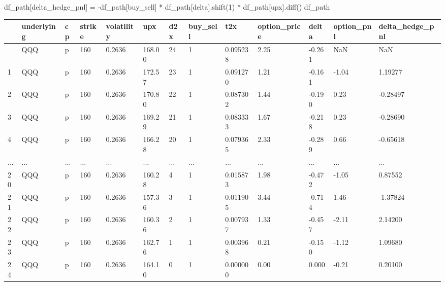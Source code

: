 \documentclass[
  letterpaper,
  DIV=11,
  numbers=noendperiod]{scrreprt}
\newenvironment{Shaded}{\begin{snugshade}}{\end{snugshade}}
\newcommand{\DecValTok}[1]{\textcolor[rgb]{0.68,0.00,0.00}{#1}}
\newcommand{\NormalTok}[1]{\textcolor[rgb]{0.00,0.23,0.31}{#1}}
\newcommand{\OperatorTok}[1]{\textcolor[rgb]{0.37,0.37,0.37}{#1}}
\newcommand{\StringTok}[1]{\textcolor[rgb]{0.13,0.47,0.30}{#1}}
\begin{document}
\begin{Shaded}
\begin{Highlighting}[]
\NormalTok{df\_path[}\StringTok{\textquotesingle{}delta\_hedge\_pnl\textquotesingle{}}\NormalTok{] }\OperatorTok{=} \OperatorTok{{-}}\NormalTok{df\_path[}\StringTok{\textquotesingle{}buy\_sell\textquotesingle{}}\NormalTok{] }\OperatorTok{*}\NormalTok{ df\_path[}\StringTok{\textquotesingle{}delta\textquotesingle{}}\NormalTok{].shift(}\DecValTok{1}\NormalTok{) }\OperatorTok{*}\NormalTok{ df\_path[}\StringTok{\textquotesingle{}upx\textquotesingle{}}\NormalTok{].diff() }
\NormalTok{df\_path}
\end{Highlighting}
\end{Shaded}

\begin{longtable}[]{@{}lllllllllllll@{}}
\toprule\noalign{}
& underlying & cp & strike & volatility & upx & d2x & buy\_sell & t2x &
option\_price & delta & option\_pnl & delta\_hedge\_pnl \\
\midrule\noalign{}
\endhead
\bottomrule\noalign{}
\endlastfoot
0 & QQQ & p & 160 & 0.2636 & 168.00 & 24 & 1 & 0.095238 & 2.25 & -0.261
& NaN & NaN \\
1 & QQQ & p & 160 & 0.2636 & 172.57 & 23 & 1 & 0.091270 & 1.21 & -0.161
& -1.04 & 1.19277 \\
2 & QQQ & p & 160 & 0.2636 & 170.80 & 22 & 1 & 0.087302 & 1.44 & -0.190
& 0.23 & -0.28497 \\
3 & QQQ & p & 160 & 0.2636 & 169.29 & 21 & 1 & 0.083333 & 1.67 & -0.218
& 0.23 & -0.28690 \\
4 & QQQ & p & 160 & 0.2636 & 166.28 & 20 & 1 & 0.079365 & 2.33 & -0.289
& 0.66 & -0.65618 \\
... & ... & ... & ... & ... & ... & ... & ... & ... & ... & ... & ... &
... \\
20 & QQQ & p & 160 & 0.2636 & 160.28 & 4 & 1 & 0.015873 & 1.98 & -0.472
& -1.05 & 0.87552 \\
21 & QQQ & p & 160 & 0.2636 & 157.36 & 3 & 1 & 0.011905 & 3.44 & -0.714
& 1.46 & -1.37824 \\
22 & QQQ & p & 160 & 0.2636 & 160.36 & 2 & 1 & 0.007937 & 1.33 & -0.457
& -2.11 & 2.14200 \\
23 & QQQ & p & 160 & 0.2636 & 162.76 & 1 & 1 & 0.003968 & 0.21 & -0.150
& -1.12 & 1.09680 \\
24 & QQQ & p & 160 & 0.2636 & 164.10 & 0 & 1 & 0.000000 & 0.00 & 0.000 &
-0.21 & 0.20100 \\
\end{longtable}
\end{document}
